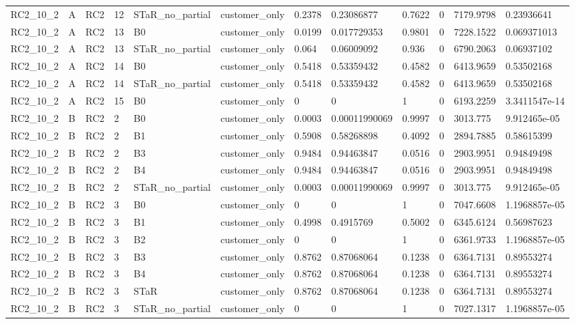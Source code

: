 \begin{longtable}{llllllllllll}
RC2\_10\_2 & A & RC2 & 12 & STaR\_no\_partial & customer\_only & 0.2378 & 0.23086877 & 0.7622 & 0 & 7179.9798 & 0.23936641 \\
RC2\_10\_2 & A & RC2 & 13 & B0 & customer\_only & 0.0199 & 0.017729353 & 0.9801 & 0 & 7228.1522 & 0.069371013 \\
RC2\_10\_2 & A & RC2 & 13 & STaR\_no\_partial & customer\_only & 0.064 & 0.06009092 & 0.936 & 0 & 6790.2063 & 0.06937102 \\
RC2\_10\_2 & A & RC2 & 14 & B0 & customer\_only & 0.5418 & 0.53359432 & 0.4582 & 0 & 6413.9659 & 0.53502168 \\
RC2\_10\_2 & A & RC2 & 14 & STaR\_no\_partial & customer\_only & 0.5418 & 0.53359432 & 0.4582 & 0 & 6413.9659 & 0.53502168 \\
RC2\_10\_2 & A & RC2 & 15 & B0 & customer\_only & 0 & 0 & 1 & 0 & 6193.2259 & 3.3411547e-14 \\
RC2\_10\_2 & B & RC2 & 2 & B0 & customer\_only & 0.0003 & 0.00011990069 & 0.9997 & 0 & 3013.775 & 9.912465e-05 \\
RC2\_10\_2 & B & RC2 & 2 & B1 & customer\_only & 0.5908 & 0.58268898 & 0.4092 & 0 & 2894.7885 & 0.58615399 \\
RC2\_10\_2 & B & RC2 & 2 & B3 & customer\_only & 0.9484 & 0.94463847 & 0.0516 & 0 & 2903.9951 & 0.94849498 \\
RC2\_10\_2 & B & RC2 & 2 & B4 & customer\_only & 0.9484 & 0.94463847 & 0.0516 & 0 & 2903.9951 & 0.94849498 \\
RC2\_10\_2 & B & RC2 & 2 & STaR\_no\_partial & customer\_only & 0.0003 & 0.00011990069 & 0.9997 & 0 & 3013.775 & 9.912465e-05 \\
RC2\_10\_2 & B & RC2 & 3 & B0 & customer\_only & 0 & 0 & 1 & 0 & 7047.6608 & 1.1968857e-05 \\
RC2\_10\_2 & B & RC2 & 3 & B1 & customer\_only & 0.4998 & 0.4915769 & 0.5002 & 0 & 6345.6124 & 0.56987623 \\
RC2\_10\_2 & B & RC2 & 3 & B2 & customer\_only & 0 & 0 & 1 & 0 & 6361.9733 & 1.1968857e-05 \\
RC2\_10\_2 & B & RC2 & 3 & B3 & customer\_only & 0.8762 & 0.87068064 & 0.1238 & 0 & 6364.7131 & 0.89553274 \\
RC2\_10\_2 & B & RC2 & 3 & B4 & customer\_only & 0.8762 & 0.87068064 & 0.1238 & 0 & 6364.7131 & 0.89553274 \\
RC2\_10\_2 & B & RC2 & 3 & STaR & customer\_only & 0.8762 & 0.87068064 & 0.1238 & 0 & 6364.7131 & 0.89553274 \\
RC2\_10\_2 & B & RC2 & 3 & STaR\_no\_partial & customer\_only & 0 & 0 & 1 & 0 & 7027.1317 & 1.1968857e-05 \\

\end{longtable}
